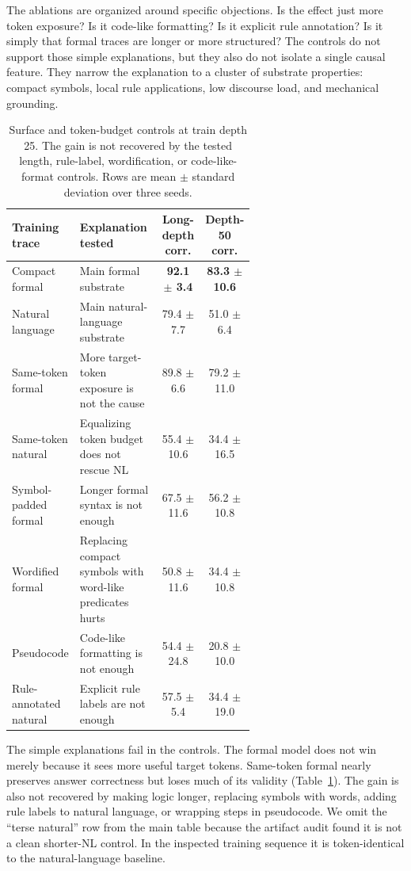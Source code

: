 \documentclass[11pt]{article}
\begin{document}
The ablations are organized around specific objections. Is the effect just more
token exposure? Is it code-like formatting? Is it explicit rule annotation? Is
it simply that formal traces are longer or more structured? The controls do not
support those simple explanations, but they also do not isolate a single causal
feature. They narrow the explanation to a cluster of substrate properties:
compact symbols, local rule applications, low discourse load, and mechanical
grounding.

\begin{table}[t]
\centering
\scriptsize
\begin{tabular}{p{0.24\linewidth}p{0.37\linewidth}cc}
\toprule
Training trace & Explanation tested & Long-depth corr. & Depth-50 corr. \\
\midrule
Compact formal & Main formal substrate & \textbf{92.1 $\pm$ 3.4} & \textbf{83.3 $\pm$ 10.6} \\
Natural language & Main natural-language substrate & 79.4 $\pm$ 7.7 & 51.0 $\pm$ 6.4 \\
Same-token formal & More target-token exposure is not the cause & 89.8 $\pm$ 6.6 & 79.2 $\pm$ 11.0 \\
Same-token natural & Equalizing token budget does not rescue NL & 55.4 $\pm$ 10.6 & 34.4 $\pm$ 16.5 \\
Symbol-padded formal & Longer formal syntax is not enough & 67.5 $\pm$ 11.6 & 56.2 $\pm$ 10.8 \\
Wordified formal & Replacing compact symbols with word-like predicates hurts & 50.8 $\pm$ 11.6 & 34.4 $\pm$ 10.8 \\
Pseudocode & Code-like formatting is not enough & 54.4 $\pm$ 24.8 & 20.8 $\pm$ 10.0 \\
Rule-annotated natural & Explicit rule labels are not enough & 57.5 $\pm$ 5.4 & 34.4 $\pm$ 19.0 \\
\bottomrule
\end{tabular}
\caption{Surface and token-budget controls at train depth 25. The gain is not
recovered by the tested length, rule-label, wordification, or code-like-format
controls. Rows are mean $\pm$ standard deviation over three seeds.}
\label{tab:syntax}
\end{table}

The simple explanations fail in the controls. The formal model does not win
merely because it sees more useful target tokens. Same-token formal nearly
preserves answer correctness but loses much of its validity
(Table~\ref{tab:syntax}). The gain is also not recovered by making logic
longer, replacing symbols with words, adding rule labels to natural language,
or wrapping steps in pseudocode. We omit the ``terse natural'' row from the main
table because the artifact audit found it is not a clean shorter-NL control. In
the inspected training sequence it is token-identical to the natural-language
baseline.
\end{document}
